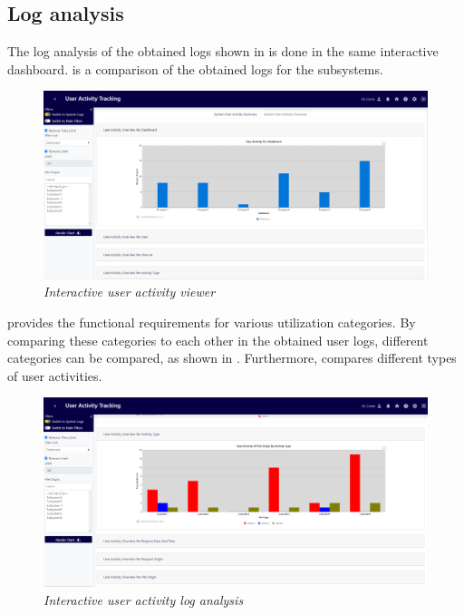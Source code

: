 \subsection{Log analysis}
The log analysis of the obtained logs shown in  is done in the same interactive dashboard.  is a comparison of the obtained logs for the subsystems.

\begin{figure}[!htb]
	\centering %
	\includegraphics[width=0.99\linewidth]{img/ch3/analysis/UAT_menu_analysis.png}
	\caption[Interactive user activity viewer]
	{\textit{Interactive user activity viewer}}\label{fig:ch3_UAT_menuAnalysis}
\end{figure}

\clearpage

 provides the functional requirements for various utilization categories. By comparing these categories to each other in the obtained user logs, different categories can be compared, as shown in . Furthermore,  compares different types of user activities.

\begin{figure}[!htb]
	\centering %
	\includegraphics[width=0.99\linewidth]{img/ch3/analysis/UAT_menu_activities.png}
	\caption[Interactive user activity log analysis]
	{\textit{Interactive user activity log analysis}}\label{fig:ch3_UAT_menuActivities}
\end{figure}

